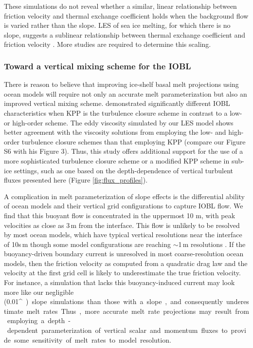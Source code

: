 \documentclass[tc, manuscript]{copernicus}
\begin{document}
These simulations do not reveal whether a similar, linear relationship between friction velocity and thermal exchange coefficient holds when the background flow is varied rather than the slope. LES of sea ice melting, for which there is no slope, suggests a sublinear relationship between thermal exchange coefficient and friction velocity \citep[$\Gamma_T \propto u_*^{0.5},\:\overline{w^\prime \theta^\prime} \propto u_*^{1.5}$;][]{ramudu_large_2018}. More studies are  required to determine this scaling. 


\subsubsection{Toward a vertical mixing scheme for the IOBL}\label{disc:prm_vmix}

There is reason to believe that improving ice-shelf basal melt projections using ocean models will require not only an accurate melt parameterization but also an improved vertical mixing scheme. \citet{jenkins_shear_2021} demonstrated significantly different IOBL characteristics when KPP is the turbulence closure scheme in contrast to a low- or high-order scheme. The eddy viscosity simulated by our LES model shows better agreement with the viscosity solutions from \citet{jenkins_shear_2021} employing the low- and high-order turbulence closure schemes than that employing KPP (compare our Figure S6 with his Figure 3). Thus, this study offers additional support for the use of a more sophisticated turbulence closure scheme or a modified KPP scheme in sub-ice settings, such as one based on the depth-dependence of vertical turbulent fluxes presented here (Figure \ref{fig:flux_profiles}).

A complication in melt parameterization of slope effects is the differential ability of ocean models and their vertical grid configurations to capture IOBL flow. We find that this buoyant flow is concentrated in the uppermost 10 m, with peak velocities as close as 3\,\unit{m} from the interface. This flow is unlikely to be resolved by most ocean models, which have typical vertical resolutions near the interface of 10s\,\unit{m} though some model configurations are reaching $\sim\!$1\,\unit{m} resolutions \citep{gwyther_cold_2020}. If the buoyancy-driven boundary current is unresolved in most coarse-resolution ocean models, then the friction velocity as computed from a quadratic drag law and the velocity at the first grid cell is likely to underestimate the true friction velocity. For instance, a simulation that lacks this buoyancy-induced current may look more like our negligible (0.01\unit{^{\circ}}) slope simulations than those with a slope, and consequently underestimate melt rates. Thus, more accurate melt rate projections may result from employing a depth-dependent parameterization of vertical scalar and momentum fluxes to provide some sensitivity of melt rates to model resolution. 
\end{document}

